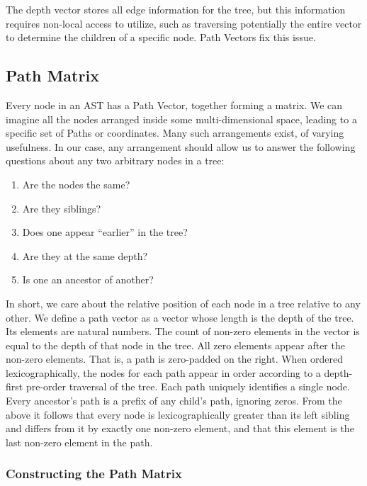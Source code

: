 ﻿\documentclass[numbers,10pt,preprint]{sigplanconf}
\begin{document}
\noindent The depth vector stores all edge information for the tree, but this information requires non-local access to utilize, such as traversing potentially the entire vector to determine the children of a specific node. Path Vectors fix this issue.

\subsection{Path Matrix}

Every node in an AST has a Path Vector, together forming a matrix.  We can imagine all the nodes arranged inside some multi-dimensional space, leading to a specific set of Paths or coordinates. Many such arrangements exist, of varying usefulness. In our case, any arrangement should allow us to answer the following questions about any two arbitrary nodes in a tree:

\begin{enumerate}[noitemsep]
\item Are the nodes the same?
\item Are they siblings?
\item Does one appear ``earlier'' in the tree?
\item Are they at the same depth?
\item Is one an ancestor of another?
\end{enumerate}

\noindent In short, we care about the relative position of each node in a tree relative to any other. We define a path vector as a vector whose length is the depth of the tree. Its elements are natural numbers.  The count of non-zero elements in the vector is equal to the depth of that node in the tree. All zero elements appear after the non-zero elements. That is, a path is zero-padded on the right. When ordered lexicographically, the nodes for each path appear in order according to a depth-first pre-order traversal of the tree. Each path uniquely identifies a single node. Every ancestor’s path is a prefix of any child’s path, ignoring zeros. From the above it follows that every node is lexicographically greater than its left sibling and differs from it by exactly one non-zero element, and that this element is the last non-zero element in the path.

\subsubsection{Constructing the Path Matrix}
\end{document}
